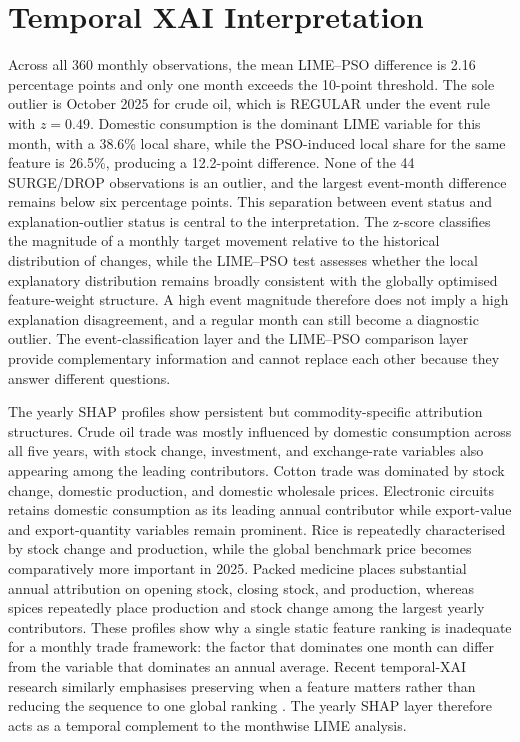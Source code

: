\documentclass[pdftex,sn-mathphys-num]{sn-jnl}
\begin{document}
\section{Temporal XAI Interpretation}
Across all 360 monthly observations, the mean LIME--PSO difference is 2.16 percentage points and only one month exceeds the 10-point threshold. The sole outlier is October 2025 for crude oil, which is REGULAR under the event rule with $z=0.49$. Domestic consumption is the dominant LIME variable for this month, with a 38.6\% local share, while the PSO-induced local share for the same feature is 26.5\%, producing a 12.2-point difference. None of the 44 SURGE/DROP observations is an outlier, and the largest event-month difference remains below six percentage points. This separation between event status and explanation-outlier status is central to the interpretation. The z-score classifies the magnitude of a monthly target movement relative to the historical distribution of changes, while the LIME--PSO test assesses whether the local explanatory distribution remains broadly consistent with the globally optimised feature-weight structure. A high event magnitude therefore does not imply a high explanation disagreement, and a regular month can still become a diagnostic outlier. The event-classification layer and the LIME–PSO comparison layer provide complementary information and cannot replace each other because they answer different questions.

The yearly SHAP profiles show persistent but commodity-specific attribution structures. Crude oil trade was mostly influenced by domestic consumption across all five years, with stock change, investment, and exchange-rate variables also appearing among the leading contributors. Cotton trade was dominated by stock change, domestic production, and domestic wholesale prices. Electronic circuits retains domestic consumption as its leading annual contributor while export-value and export-quantity variables remain prominent. Rice is repeatedly characterised by stock change and production, while the global benchmark price becomes comparatively more important in 2025. Packed medicine places substantial annual attribution on opening stock, closing stock, and production, whereas spices repeatedly place production and stock change among the largest yearly contributors. These profiles show why a single static feature ranking is inadequate for a monthly trade framework: the factor that dominates one month can differ from the variable that dominates an annual average. Recent temporal-XAI research similarly emphasises preserving when a feature matters rather than reducing the sequence to one global ranking \cite{canti2024,vanzy2024,hertel2026}. The yearly SHAP layer therefore acts as a temporal complement to the monthwise LIME analysis.
\end{document}
